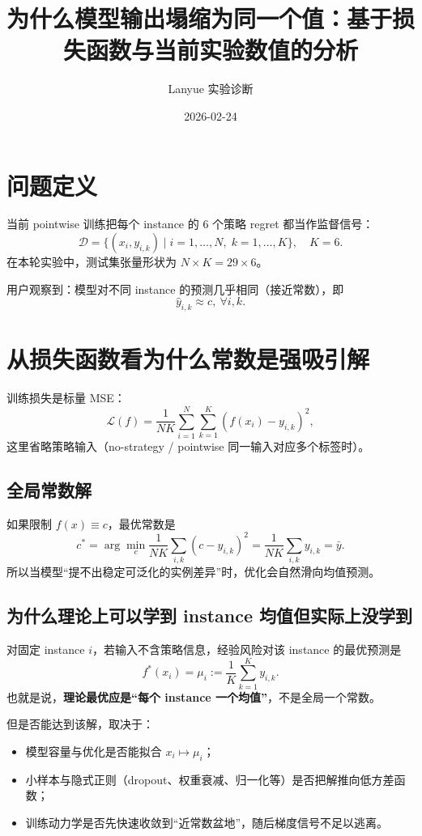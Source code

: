 \documentclass[11pt]{article}
\title{为什么模型输出塌缩为同一个值：基于损失函数与当前实验数值的分析}
\author{Lanyue 实验诊断}
\date{2026-02-24}
\begin{document}
\maketitle

\section{问题定义}
当前 pointwise 训练把每个 instance 的 6 个策略 regret 都当作监督信号：
\[
\mathcal D=\{(x_i, y_{i,k})\mid i=1,\dots,N,\;k=1,\dots,K\},\quad K=6.
\]
在本轮实验中，测试集张量形状为 $N\times K=29\times 6$。

用户观察到：模型对不同 instance 的预测几乎相同（接近常数），即
\[
\hat y_{i,k}\approx c,\ \forall i,k.
\]

\section{从损失函数看为什么常数是强吸引解}
训练损失是标量 MSE：
\[
\mathcal L(f)=\frac{1}{NK}\sum_{i=1}^{N}\sum_{k=1}^{K}(f(x_i)-y_{i,k})^2,
\]
这里省略策略输入（no-strategy / pointwise 同一输入对应多个标签时）。

\subsection{全局常数解}
如果限制 $f(x)\equiv c$，最优常数是
\[
 c^*=\arg\min_c \frac{1}{NK}\sum_{i,k}(c-y_{i,k})^2
   =\frac{1}{NK}\sum_{i,k}y_{i,k}=\bar y.
\]
所以当模型“提不出稳定可泛化的实例差异”时，优化会自然滑向均值预测。

\subsection{为什么理论上可以学到 instance 均值但实际上没学到}
对固定 instance $i$，若输入不含策略信息，经验风险对该 instance 的最优预测是
\[
 f^*(x_i)=\mu_i:=\frac{1}{K}\sum_{k=1}^{K}y_{i,k}.
\]
也就是说，\textbf{理论最优应是“每个 instance 一个均值”}，不是全局一个常数。

但是否能达到该解，取决于：
\begin{itemize}
  \item 模型容量与优化是否能拟合 $x_i\mapsto \mu_i$；
  \item 小样本与隐式正则（dropout、权重衰减、归一化等）是否把解推向低方差函数；
  \item 训练动力学是否先快速收敛到“近常数盆地”，随后梯度信号不足以逃离。
\end{itemize}
\end{document}
